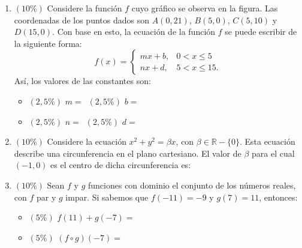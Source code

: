 \documentclass[11pt]{article}
\newcommand{\resp}{\ \underline{\hspace{3.2cm}}}
\begin{document}
\begin{enumerate}
\item $(10\%)$ Considere la función $f$ cuyo gráfico se observa en la figura. Las coordenadas de los puntos dados son $A(0, 21)$, $B(5, 0)$, $C(5, 10)$ y $D(15, 0)$. Con base en esto, la ecuación de la función $f$ se puede escribir de la siguiente forma:
\[
f(x) = \begin{cases}
mx + b, & 0 < x \leq 5 \\
nx + d, & 5 < x \leq 15.
\end{cases}
\]
Así, los valores de las constantes son:
\begin{center}
\end{center}
\begin{itemize}
\item[] $(2{,}5\%)$ $m = $\resp \qquad $(2{,}5\%)$ $b = $\resp
\item[] $(2{,}5\%)$ $n = $\resp \qquad $(2{,}5\%)$ $d = $\resp
\end{itemize}

\item $(10\%)$ Considere la ecuación $x^2 + y^2 = \beta x$, con $\beta \in \mathbb{R} - \{0\}$. Esta ecuación describe una circunferencia en el plano cartesiano. El valor de $\beta$ para el cual $(-1, 0)$ es el centro de dicha circunferencia es:

\item $(10\%)$ Sean $f$ y $g$ funciones con dominio el conjunto de los números reales, con $f$ par y $g$ impar. Si sabemos que $f(-11) = -9$ y $g(7) = 11$, entonces:
\begin{itemize}
\item[] $(5\%)$ $f(11) + g(-7) = $\resp
\item[] $(5\%)$ $(f \circ g)(-7) = $\resp
\end{itemize}


\end{enumerate}
\end{document}
